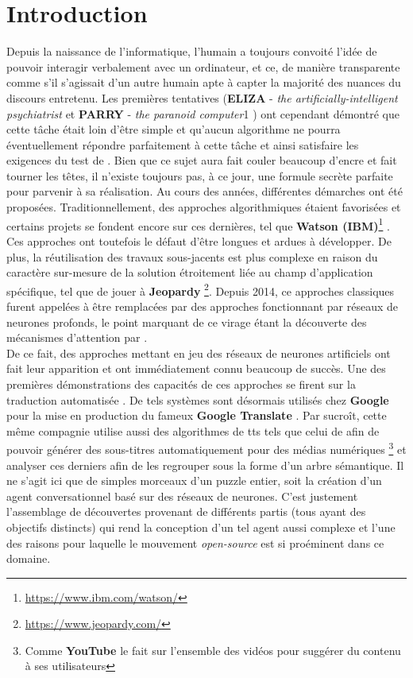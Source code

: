 \section{Introduction}

Depuis la naissance de l'informatique, l'humain a toujours convoité l'idée de pouvoir interagir verbalement avec un ordinateur, et ce, de manière transparente comme s'il s'agissait d'un autre humain apte à capter la majorité des nuances du discours entretenu. Les premières tentatives (\textbf{ELIZA} - \textit{the artificially-intelligent psychiatrist} \cite{elizaWeizenbaum} et \textbf{PARRY} - \textit{the paranoid computer}1 \cite{parryCerf}) ont cependant démontré que cette tâche était loin d'être simple et qu'aucun algorithme ne pourra éventuellement répondre parfaitement à cette tâche et ainsi satisfaire les exigences du test de \cite{turingTest}. Bien que ce sujet aura fait couler beaucoup d'encre et fait tourner les têtes, il n'existe toujours pas, à ce jour, une formule secrète parfaite pour parvenir à sa réalisation. Au cours des années, différentes démarches ont été proposées. Traditionnellement, des approches algorithmiques étaient favorisées et certains projets se fondent encore sur ces dernières, tel que \textbf{Watson (IBM)}\footnote{\url{https://www.ibm.com/watson/}} \cite{ibmWatson}. Ces approches ont toutefois le défaut d'être longues et ardues à développer. De plus, la réutilisation des travaux sous-jacents est plus complexe en raison du caractère sur-mesure de la solution étroitement liée au champ d'application spécifique, tel que de jouer à \textbf{Jeopardy} \footnote{\url{https://www.jeopardy.com/}}. Depuis 2014, ce approches classiques furent appelées à être remplacées par des approches fonctionnant par réseaux de neurones profonds, le point marquant de ce virage étant la découverte des mécanismes d'attention par \cite{attentionMechanism}. \\

De ce fait, des approches mettant en jeu des réseaux de neurones artificiels ont fait leur apparition et ont immédiatement connu beaucoup de succès. Une des premières démonstrations des capacités de ces approches se firent sur la traduction automatisée \cite{attentionMechanism}. De tels systèmes sont désormais utilisés chez \textbf{Google} pour la mise en production du fameux \textbf{Google Translate} \cite{googleTranslate}. Par sucroît, cette même compagnie utilise aussi des algorithmes de \gls{tts} tels que celui de \cite{acousticModeling} afin de pouvoir générer des sous-titres automatiquement pour des médias numériques \footnote{Comme \textbf{YouTube} le fait sur l'ensemble des vidéos pour suggérer du contenu à ses utilisateurs} et analyser ces derniers afin de les regrouper sous la forme d'un arbre sémantique. Il ne s'agit ici que de simples morceaux d'un puzzle entier, soit la création d'un agent conversationnel basé sur des réseaux de neurones. C'est justement l'assemblage de découvertes provenant de différents partis (tous ayant des objectifs distincts) qui rend la conception d'un tel agent aussi complexe et l'une des raisons pour laquelle le mouvement \textit{open-source} est si proéminent dans ce domaine. \\

